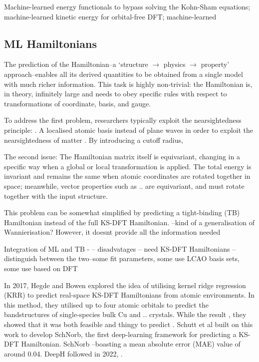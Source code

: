 \documentclass[11pt,a4paper,twoside]{report}  %
\numberwithin{equation}{section}					%
\numberwithin{figure}{section}						%
\begin{document}
Machine-learned energy functionals to bypass solving the Kohn-Sham equations; machine-learned kinetic energy for orbital-free DFT; machine-learned 

\subsection{ML Hamiltonians}

The prediction of the Hamiltonian--a `structure $\rightarrow$ physics $\rightarrow$ property' approach--enables all its derived quantities to be obtained from a single model with much richer information. This task is highly non-trivial: the Hamiltonian is, in theory, infinitely large and needs to obey specific rules with respect to transformations of coordinate, basis, and gauge. 

To address the first problem, researchers typically exploit the nearsightedness principle: . A localised atomic basis instead of plane waves in order to exploit the nearsightedness of matter . By introducing a cutoff radius, 

The second issue: The Hamiltonian matrix itself is equivariant, changing in a specific way when a global or local transformation is applied. The total energy is invariant and remains the same when atomic coordinates are rotated together in space; meanwhile, vector properties such as .. are equivariant, and must rotate together with the input structure\autocite{liDeeplearningDensityFunctional2022}.

This problem can be somewhat simplified by predicting a tight-binding (TB) Hamiltonian instead of the full KS-DFT Hamiltonian.  --kind of a generalisation of Wannierisation? However, it doesnt provide all the information needed

 Integration of ML and TB - -- disadvatages -- need KS-DFT Hamiltonians -- distinguish between the two--some fit parameters, some use LCAO basis sets, some use based on DFT

In 2017, Hegde and Bowen explored the idea of utilising kernel ridge regression (KRR) to predict real-space KS-DFT Hamiltonians from atomic environments\autocite{hegdeMachinelearnedApproximationsDensity2017}. In this method, they utilised up to four atomic orbitals to predict the bandstructures of single-species bulk Cu and .. crystals. While the result , they showed that it was both feasible and thingy to predict . Schutt et al built on this work to develop SchNorb, the first deep-learning framework for predicting a KS-DFT Hamiltonian. SchNorb --boasting a mean absolute error (MAE) value of around 0.04. DeepH followed in 2022, . 
\end{document}
